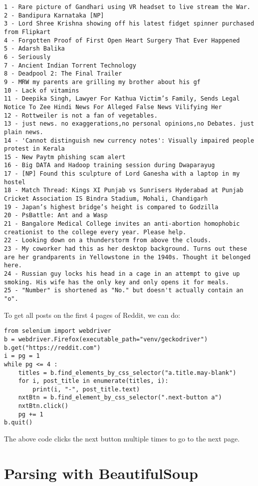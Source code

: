 \vspace{-15pt}
\begin{verbatim}
1 - Rare picture of Gandhari using VR headset to live stream the War.
2 - Bandipura Karnataka [NP]
3 - Lord Shree Krishna showing off his latest fidget spinner purchased from Flipkart
4 - Forgotten Proof of First Open Heart Surgery That Ever Happened
5 - Adarsh Balika
6 - Seriously
7 - Ancient Indian Torrent Technology
8 - Deadpool 2: The Final Trailer
9 - MRW my parents are grilling my brother about his gf
10 - Lack of vitamins
11 - Deepika Singh, Lawyer For Kathua Victim’s Family, Sends Legal Notice To Zee Hindi News For Alleged False News Vilifying Her
12 - Rottweiler is not a fan of vegetables.
13 - just news. no exaggerations,no personal opinions,no Debates. just plain news.
14 - 'Cannot distinguish new currency notes': Visually impaired people protest in Kerala
15 - New Paytm phishing scam alert
16 - Big DATA and Hadoop training session during Dwaparayug
17 - [NP] Found this sculpture of Lord Ganesha with a laptop in my hostel
18 - Match Thread: Kings XI Punjab vs Sunrisers Hyderabad at Punjab Cricket Association IS Bindra Stadium, Mohali, Chandigarh
19 - Japan’s highest bridge’s height is compared to Godzilla
20 - PsBattle: Ant and a Wasp
21 - Bangalore Medical College invites an anti-abortion homophobic creationist to the college every year. Please help.
22 - Looking down on a thunderstorm from above the clouds.
23 - My coworker had this as her desktop background. Turns out these are her grandparents in Yellowstone in the 1940s. Thought it belonged here.
24 - Russian guy locks his head in a cage in an attempt to give up smoking. His wife has the only key and only opens it for meals.
25 - "Number" is shortened as "No." but doesn't actually contain an "o".
\end{verbatim}
\vspace{-10pt}	

\noindent
To get all posts on the first 4 pages of Reddit, we can do:

\vspace{-15pt}
\begin{verbatim}
from selenium import webdriver
b = webdriver.Firefox(executable_path="venv/geckodriver")
b.get("https://reddit.com")
i = pg = 1
while pg <= 4 :
	titles = b.find_elements_by_css_selector("a.title.may-blank")
	for i, post_title in enumerate(titles, i):
		print(i, "-", post_title.text)
	nxtBtn = b.find_element_by_css_selector(".next-button a")
	nxtBtn.click()
	pg += 1
b.quit()
\end{verbatim}
\vspace{-10pt}	

\noindent
The above code clicks the next button multiple times to go to the next page. 

\chapter{Parsing with BeautifulSoup}
